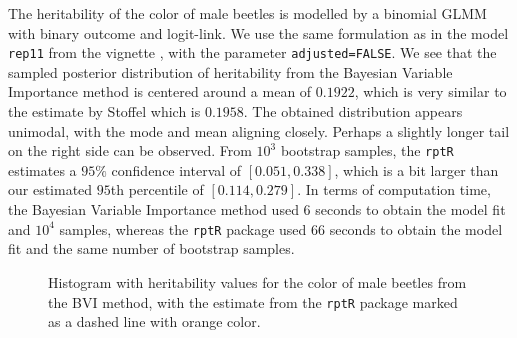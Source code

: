 The heritability of the color of male beetles is modelled by a binomial GLMM with binary outcome and logit-link. We use the same formulation as in the model \texttt{rep11} from the vignette \citep{Stoffel2017rptR}, with the parameter \texttt{adjusted=FALSE}. We see that the sampled posterior distribution of heritability  from the Bayesian Variable Importance method is centered around a mean of $0.1922$, which is very similar to the estimate by Stoffel which is $0.1958$. The obtained distribution appears unimodal, with the mode and mean aligning closely. Perhaps a slightly longer tail on the right side can be observed. From $10^3$ bootstrap samples, the \texttt{rptR} estimates a $95\%$ confidence interval of $[0.051, 0.338]$, which is a bit larger than our estimated $95$th percentile of $[0.114, 0.279]$. In terms of computation time, the Bayesian Variable Importance method used $6$ seconds to obtain the model fit and $10^4$ samples, whereas the \texttt{rptR} package used $66$ seconds to obtain the model fit and the same number of bootstrap samples.
\begin{figure}[H]
  \centering
  \caption{Histogram with heritability values for the color of male beetles from the BVI method, with the estimate from the \texttt{rptR} package marked as a dashed line with orange color.}
\end{figure}
